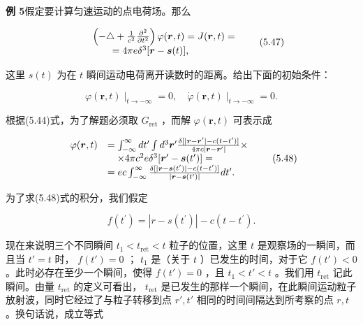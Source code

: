\textbf{例 5}\quad 假定要计算匀速运动的点电荷场。那么

\begin{equation*}
\begin{array}{r l} & {\left(- \triangle + \frac {1}{c ^ {2}} \frac {\partial^ {2}}{\partial t ^ {2}}\right) \varphi (\boldsymbol {r}, t) = J (\boldsymbol {r}, t) =} \\ & {\qquad = 4 \pi e \delta^ {3} [ \boldsymbol {r} - \boldsymbol {s} (t) ],} \end{array}\tag{5.47}
\end{equation*}

这里 $s(t)$ 为在 $t$ 瞬间运动电荷离开读数时的距离。给出下面的初始条件：

\begin{equation*}
\varphi (\boldsymbol {r}, t) \mid_ {t \rightarrow - \infty} = 0, \quad \dot {\varphi} (\boldsymbol {r}, t) \mid_ {t \rightarrow - \infty} = 0.
\end{equation*}

根据(5.44)式，为了解题必须取 $G_{\mathrm{ret}}$ ，而解 $\varphi (\pmb {r},t)$ 可表示成

\begin{equation*}
\begin{array}{r l} \varphi (\boldsymbol {r}, t) & = \int_ {- \infty} ^ {\infty} d t ^ {\prime} \int d ^ {3} \boldsymbol {r} ^ {\prime} \frac {\delta [ | \boldsymbol {r} - \boldsymbol {r} ^ {\prime} | - c (t - t ^ {\prime}) ]}{4 \pi c | \boldsymbol {r} - \boldsymbol {r} ^ {\prime} |} \times \\ & \quad \times 4 \pi c ^ {2} e \delta^ {3} [ \boldsymbol {r} ^ {\prime} - \boldsymbol {s} (t ^ {\prime}) ] = \\ & = e c \int_ {- \infty} ^ {\infty} \frac {\delta [ | \boldsymbol {r} - \boldsymbol {s} (t ^ {\prime}) | - c (t - t ^ {\prime}) ]}{| \boldsymbol {r} - \boldsymbol {s} (t ^ {\prime}) |} d t ^ {\prime}. \end{array} \tag{5.48}
\end{equation*}

为了求(5.48)式的积分，我们假定

\begin{equation*}
f (t ^ {\prime}) = | r - s (t ^ {\prime}) | - c (t - t ^ {\prime}).
\end{equation*}

现在来说明三个不同瞬间 $t_1 < t_{\mathrm{ret}} < t$ 粒子的位置，这里 $t$ 是观察场的一瞬间，而且当 $t' = t$ 时， $f(t') = 0$ ； $t_1$ 是（关于 $t$ ）已发生的时间，对于它 $f(t') < 0$ 。此时必存在至少一个瞬间，使得 $f(t') = 0$ ，且 $t_1 < t' < t$ 。我们用 $t_{\mathrm{ret}}$ 记此瞬间。由量 $t_{\mathrm{ret}}$ 的定义可看出， $t_{\mathrm{ret}}$ 是已发生的那样一个瞬间，在此瞬间运动粒子放射波，同时它经过了与粒子转移到点 $r', t'$ 相同的时间间隔达到所考察的点 $r, t$ 。换句话说，成立等式

